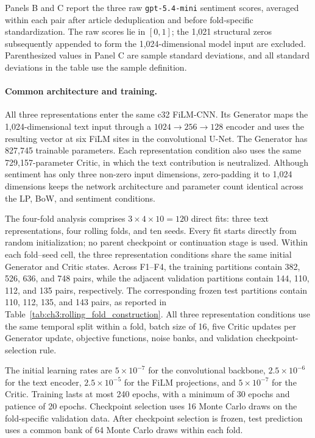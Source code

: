 \begin{table}[htbp]
\begin{minipage}{\textwidth}
Panels B and C report the three raw \texttt{gpt-5.4-mini} sentiment scores,
averaged within each pair after article deduplication and before fold-specific
standardization. The raw scores lie in $[0,1]$; the 1,021 structural zeros
subsequently appended to form the 1,024-dimensional model input are excluded.
Parenthesized values in Panel C are sample standard deviations, and all
standard deviations in the table use the sample definition.
\end{minipage}
\end{table}

\paragraph*{Common architecture and training.}
All three representations enter the same c32 FiLM-CNN. Its Generator maps the
1,024-dimensional text input through a $1024\rightarrow256\rightarrow128$
encoder and uses the resulting vector at six FiLM sites in the convolutional
U-Net. The Generator has 827,745 trainable parameters. Each representation
condition also uses the same 729,157-parameter Critic, in which the text contribution is
neutralized. Although sentiment has only three non-zero input dimensions,
zero-padding it to 1,024 dimensions keeps the network architecture and
parameter count identical across the LP, BoW, and sentiment conditions.

The four-fold analysis comprises
$3\times4\times10=120$ direct fits: three text representations, four rolling
folds, and ten seeds. Every fit starts directly from random initialization;
no parent checkpoint or continuation stage is used. Within each
fold--seed cell, the three representation conditions share the same initial
Generator and Critic states. Across F1--F4, the training partitions contain
382, 526, 636, and 748 pairs, while the adjacent validation partitions contain
144, 110, 112, and 135 pairs, respectively. The corresponding frozen test
partitions contain 110, 112, 135, and 143 pairs, as reported in
Table~\ref{tab:ch3:rolling_fold_construction}. All three representation
conditions use the same temporal split within a fold, batch size of 16, five Critic updates per Generator
update, objective functions, noise banks, and validation checkpoint-selection
rule.

The initial learning rates are $5\times10^{-7}$ for the convolutional
backbone, $2.5\times10^{-6}$ for the text encoder,
$2.5\times10^{-5}$ for the FiLM projections, and $5\times10^{-7}$ for the
Critic. Training lasts at most 240 epochs, with a minimum of 30 epochs and
patience of 20 epochs. Checkpoint selection uses 16 Monte Carlo draws on the
fold-specific validation data. After checkpoint selection is frozen, test
prediction uses a common bank of 64 Monte Carlo draws within each fold.

